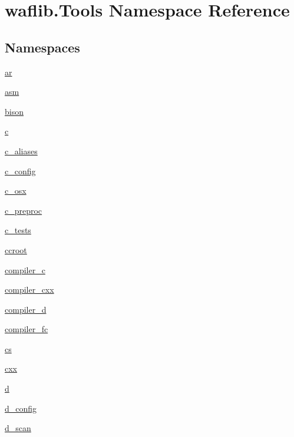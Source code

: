 \hypertarget{namespacewaflib_1_1_tools}{}\section{waflib.\+Tools Namespace Reference}
\label{namespacewaflib_1_1_tools}
\subsection*{Namespaces}
\begin{DoxyCompactItemize}
\item 
 \hyperlink{namespacewaflib_1_1_tools_1_1ar}{ar}
\item 
 \hyperlink{namespacewaflib_1_1_tools_1_1asm}{asm}
\item 
 \hyperlink{namespacewaflib_1_1_tools_1_1bison}{bison}
\item 
 \hyperlink{namespacewaflib_1_1_tools_1_1c}{c}
\item 
 \hyperlink{namespacewaflib_1_1_tools_1_1c__aliases}{c\+\_\+aliases}
\item 
 \hyperlink{namespacewaflib_1_1_tools_1_1c__config}{c\+\_\+config}
\item 
 \hyperlink{namespacewaflib_1_1_tools_1_1c__osx}{c\+\_\+osx}
\item 
 \hyperlink{namespacewaflib_1_1_tools_1_1c__preproc}{c\+\_\+preproc}
\item 
 \hyperlink{namespacewaflib_1_1_tools_1_1c__tests}{c\+\_\+tests}
\item 
 \hyperlink{namespacewaflib_1_1_tools_1_1ccroot}{ccroot}
\item 
 \hyperlink{namespacewaflib_1_1_tools_1_1compiler__c}{compiler\+\_\+c}
\item 
 \hyperlink{namespacewaflib_1_1_tools_1_1compiler__cxx}{compiler\+\_\+cxx}
\item 
 \hyperlink{namespacewaflib_1_1_tools_1_1compiler__d}{compiler\+\_\+d}
\item 
 \hyperlink{namespacewaflib_1_1_tools_1_1compiler__fc}{compiler\+\_\+fc}
\item 
 \hyperlink{namespacewaflib_1_1_tools_1_1cs}{cs}
\item 
 \hyperlink{namespacewaflib_1_1_tools_1_1cxx}{cxx}
\item 
 \hyperlink{namespacewaflib_1_1_tools_1_1d}{d}
\item 
 \hyperlink{namespacewaflib_1_1_tools_1_1d__config}{d\+\_\+config}
\item 
 \hyperlink{namespacewaflib_1_1_tools_1_1d__scan}{d\+\_\+scan}

\end{DoxyCompactItemize}
